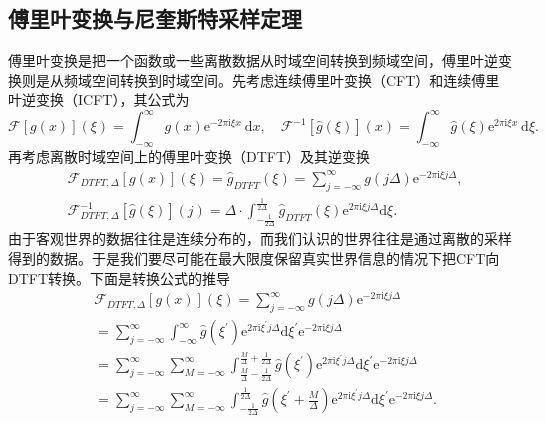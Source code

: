 \subsection{傅里叶变换与尼奎斯特采样定理}
傅里叶变换是把一个函数或一些离散数据从时域空间转换到频域空间，傅里叶逆变换则是从频域空间转换到时域空间\cite{xu2018understanding}。先考虑连续傅里叶变换（CFT）和连续傅里叶逆变换（ICFT），其公式为
    \begin{equation}
\mathcal{F}[g(x)](\xi)=\int_{-\infty}^{\infty} g(x) \mathrm{e}^{-2 \pi \mathrm{i} \xi x} \mathrm{~d} x, \quad \mathcal{F}^{-1}[\hat{g}(\xi)](x)=\int_{-\infty}^{\infty} \hat{g}(\xi) \mathrm{e}^{2 \pi \mathrm{i} \xi x} \mathrm{~d} \xi .
\end{equation}
再考虑离散时域空间上的傅里叶变换（DTFT）及其逆变换
\begin{equation}
\begin{aligned}
& \mathcal{F}_{D T F T, \Delta}[g(x)](\xi)=\hat{g}_{D T F T}(\xi)=\sum_{j=-\infty}^{\infty} g(j \Delta) \mathrm{e}^{-2 \pi \mathrm{i} \xi j \Delta}, \\
& \mathcal{F}_{D T F T, \Delta}^{-1}[\hat{g}(\xi)](j)=\Delta \cdot \int_{-\frac{1}{2 \Delta}}^{\frac{1}{2 \Delta}} \hat{g}_{D T F T}(\xi) \mathrm{e}^{2 \pi \mathrm{i} \xi j \Delta} \mathrm{d} \xi.
\end{aligned}
\end{equation}
由于客观世界的数据往往是连续分布的，而我们认识的世界往往是通过离散的采样得到的数据。于是我们要尽可能在最大限度保留真实世界信息的情况下把CFT向DTFT转换。下面是转换公式的推导
\begin{equation}
\begin{aligned}
& \mathcal{F}_{D T F T, \Delta}[g(x)](\xi)=\sum_{j=-\infty}^{\infty} g(j \Delta) \mathrm{e}^{-2 \pi \mathrm{i} \xi j \Delta} \\
& =\sum_{j=-\infty}^{\infty} \int_{-\infty}^{\infty} \hat{g}\left(\xi^{\prime}\right) \mathrm{e}^{2 \pi \mathrm{i} \xi^{\prime} j \Delta} \mathrm{d} \xi^{\prime} \mathrm{e}^{-2 \pi \mathrm{i} \xi j \Delta} \\
& =\sum_{j=-\infty}^{\infty} \sum_{M=-\infty}^{\infty} \int_{\frac{M}{\Delta}-\frac{1}{2 \Delta}}^{\frac{M}{\Delta}+\frac{1}{2 \Delta}} \hat{g}\left(\xi^{\prime}\right) \mathrm{e}^{2 \pi \mathrm{i} \xi^{\prime} j \Delta} \mathrm{d} \xi^{\prime} \mathrm{e}^{-2 \pi \mathrm{i} \xi j \Delta} \\
& =\sum_{j=-\infty}^{\infty} \sum_{M=-\infty}^{\infty} \int_{-\frac{1}{2 \Delta}}^{\frac{1}{2 \Delta}} \hat{g}\left(\xi^{\prime}+\frac{M}{\Delta}\right) \mathrm{e}^{2 \pi \mathrm{i} \xi^{\prime} j \Delta} \mathrm{d} \xi^{\prime} \mathrm{e}^{-2 \pi \mathrm{i} \xi j \Delta} .\\
&
\end{aligned}
\end{equation}
